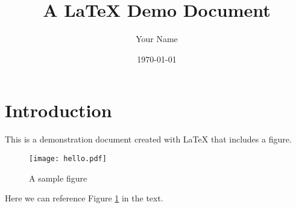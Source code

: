 \documentclass{article}
\title{A \LaTeX{} Demo Document}
\author{Your Name}
\date{\today}
\begin{document}
\maketitle

\section{Introduction}
This is a demonstration document created with \LaTeX{} that includes a figure.

\begin{figure}[h]
    \centering
    \texttt{[image: hello.pdf]}
    \caption{A sample figure}
    \label{fig:hello}
\end{figure}

Here we can reference Figure \ref{fig:hello} in the text.
\end{document}
